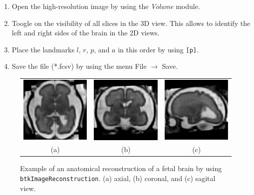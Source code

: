 \begin{description}
\begin{enumerate}
\item Open the high-resolution image by using the \textit{Volume} module.
\item Toogle on the visibility of all slices in the 3D view. This allows to
identify the left and right sides of the brain in the 2D views.
\item Place the landmarks $l$, $r$, $p$, and $a$ in this order by using
\texttt{[p]}.
\item Save the file (*.fcsv) by using the menu File $\rightarrow$ Save.
\end{enumerate}


\begin{figure}[t]
\centering
\begin{tabular}{ccc}
\includegraphics[width=0.3\columnwidth]{hr_axl.eps}&
\includegraphics[width=0.3\columnwidth]{hr_cor.eps}&
\includegraphics[width=0.3\columnwidth]{hr_sag.eps}\\
{(a)}&{(b)}&{(c)}\\
\end{tabular}
\caption{Example of an anatomical reconstruction of a fetal brain by using
\texttt{btkImageReconstruction}. (a) axial, (b) coronal, and (c) sagital view.}
\label{fig:reconstruction}
\end{figure}


\end{description}
